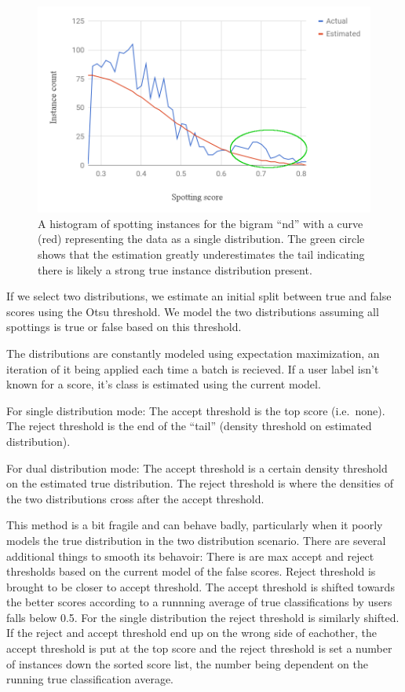 \documentclass[ms,electronic,twosidetoc,letterpaper,chaptercenter,parttop,lol,lof,lot]{byumsphd}
\begin{document}
\begin{figure}
    \centering
    \includegraphics[width=.75\textwidth]{tail_dist_ex}
    \caption{A histogram of spotting instances for the bigram ``nd'' with a curve (red) representing the data as a single distribution. The green circle shows that the estimation greatly underestimates the tail indicating there is likely a strong true instance distribution present.
    }
    \label{fig:tail_dist_ex}
\end{figure}

If we select two distributions, we estimate an initial split between true and false scores using the Otsu threshold. We model the two distributions assuming all spottings is true or false based on this threshold.

The distributions are constantly modeled using expectation maximization, an iteration of it being applied each time a batch is recieved. If a user label isn't known for a score, it's class is estimated using the current model.



For single distribution mode:
The accept threshold is the top score (i.e.~none).
The reject threshold is the end of the ``tail'' (density threshold on estimated distribution).

For dual distribution mode:
The accept threshold is a certain density threshold on the estimated true distribution.
The reject threshold is where the densities of the two distributions cross after the accept threshold.

This method is a bit fragile and can behave badly, particularly when it poorly models the true distribution in the two distribution scenario. There are several additional things to smooth its behavoir: 
There is are max accept and reject thresholds based on the current model of the false scores.
Reject threshold is brought to be closer to accept threshold.
The accept threshold is  shifted towards the better scores according to a runnning average of true classifications by users falls below 0.5.
For the single distribution the reject threshold is similarly shifted.
If the reject and accept threshold end up on the wrong side of eachother, the accept threshold is put at the top score and the reject threshold is set a number of instances down the sorted score list, the number being dependent on the running true classification average.
\end{document}
